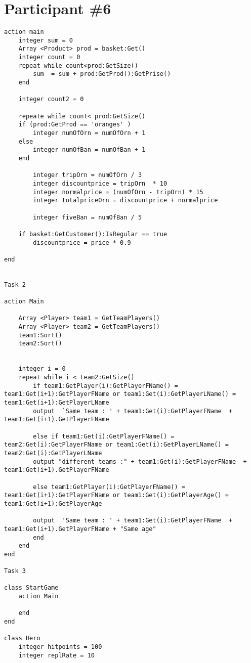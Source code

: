 \section{Participant \#6}
\begin{lstlisting}[language=Quorum,tabsize=2]
action main
	integer sum = 0
	Array <Product> prod = basket:Get()
	integer count = 0
	repeat while count<prod:GetSize()
		sum  = sum + prod:GetProd():GetPrise()
	end
	
	integer count2 = 0
	
	repeate while count< prod:GetSize()
	if (prod:GetProd == 'oranges' )
		integer numOfOrn = numOfOrn + 1
	else 
		integer numOfBan = numOfBan + 1
	end
	
		integer tripOrn = numOfOrn / 3
		integer discountprice = tripOrn  * 10
		integer normalprice = (numOfOrn - tripOrn) * 15
		integer totalpriceOrn = discountprice + normalprice
		
		integer fiveBan = numOfBan / 5
	
	if basket:GetCustomer():IsRegular == true
		discountprice = price * 0.9
		
end


Task 2

action Main

	Array <Player> team1 = GetTeamPlayers()
	Array <Player> team2 = GetTeamPlayers()
	team1:Sort()
	team2:Sort()
	
	
	integer i = 0
	repeat while i < team2:GetSize()
		if team1:GetPlayer(i):GetPlayerFName() = team1:Get(i+1):GetPlayerFName or team1:Get(i):GetPlayerLName() = team1:Get(i+1):GetPlayerLName
		output  `Same team : ' + team1:Get(i):GetPlayerFName  +  team1:Get(i+1).GetPlayerFName
		
		else if team1:Get(i):GetPlayerFName() = team2:Get(i):GetPlayerFName or team1:Get(i):GetPlayerLName() = team2:Get(i):GetPlayerLName
		output "different teams :" + team1:Get(i):GetPlayerFName  +  team1:Get(i+1).GetPlayerFName
		
		else team1:GetPlayer(i):GetPlayerFName() = team1:Get(i+1):GetPlayerFName or team1:Get(i):GetPlayerAge() = team1:Get(i+1):GetPlayerAge
		
		output  'Same team : ' + team1:Get(i):GetPlayerFName  +  team1:Get(i+1).GetPlayerFName + "Same age"
		end
	end	
end

Task 3

class StartGame
	action Main
	
	end
end

class Hero
	integer hitpoints = 100
	integer replRate = 10
	

\end{lstlisting}
